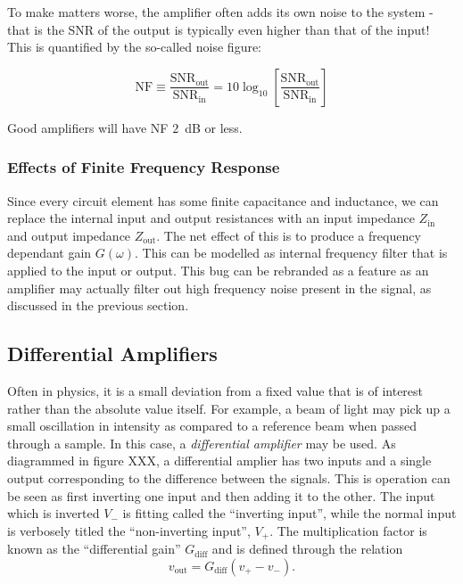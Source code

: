 \documentclass[]{article}
\begin{document}
To make matters worse, the amplifier often adds its own noise to the system - that is the SNR of the output is typically even higher than that of the input! This is quantified by the so-called noise figure:

\begin{equation}
\label{eq:def_noise_figure}
\text{NF} \equiv \frac{\text{SNR}_\text{out}}{\text{SNR}_\text{in}} = 10\log_{10}\left[\frac{\text{SNR}_\text{out}}{\text{SNR}_\text{in}}\right]
\end{equation}

\noindent Good amplifiers will have NF $2$~dB or less.

\subsubsection{Effects of Finite Frequency Response}
Since every circuit element has some finite capacitance and inductance, we can replace the internal input and output resistances with an input impedance $Z_\text{in}$ and output impedance $Z_\text{out}$. The net effect of this is to produce a frequency dependant gain $G(\omega)$. This can be modelled as internal frequency filter that is applied to the input or output. This bug can be rebranded as a feature as an amplifier may actually filter out high frequency noise present in the signal, as discussed in the previous section.

\subsection{Differential Amplifiers}
Often in physics, it is a small deviation from a fixed value that is of interest rather than the absolute value itself. For example, a beam of light may pick up a small oscillation in intensity as compared to a reference beam when passed through a sample. In this case, a \textit{differential amplifier} may be used. As diagrammed in figure XXX, a differential amplier has two inputs and a single output corresponding to the difference between the signals. This is operation can be seen as first inverting one input and then adding it to the other. The input which is inverted $V_-$ is fitting called the ``inverting input'', while the normal input is verbosely titled the ``non-inverting input'', $V_+$. The multiplication factor is known as the ``differential gain'' $G_\text{diff}$ and is defined through the relation
\begin{equation}
\label{eq:def_diff_amp}
v_\text{out} = G_\text{diff}\left(v_+-v_-\right).
\end{equation}
\end{document}
